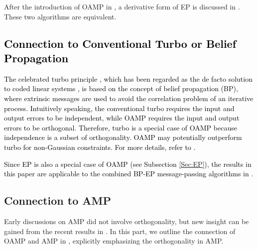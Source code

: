 \documentclass[journal]{IEEEtran}
\newcommand{\LL}[1]{\textcolor{black}{#1}}
\begin{document}
After the introduction of OAMP in \cite{Ma2016}, a derivative form of EP is discussed in  \cite{Fletcher2016}. These two algorithms are equivalent. 
 
\subsection{\LL{Connection to Conventional Turbo or Belief Propagation}}\label{Sec:BP}
\LL{The celebrated turbo principle \cite{TurboCode, Wang1999, Tuchler2002, Douillard1995}, which has been regarded as the de facto solution to coded linear systems \cite{Loeliger2007,  Yuan2014, LiuLei2019TSP}, is based on the concept of belief propagation (BP), where extrinsic messages are used to avoid the correlation problem of an iterative process. Intuitively speaking, the conventional turbo requires the input and output errors to be independent, while OAMP requires the input and output errors to be orthogonal. Therefore, turbo is a special case of OAMP because independence is a subset of orthogonality. OAMP may potentially outperform turbo for non-Gaussian constraints. For more details, refer to \cite[Section III-D]{MaLiu2018}.}

\LL{Since EP is also a special case of OAMP (see Subsection \ref{Sec:EP}), the results in this paper are  applicable to the combined BP-EP message-passing algorithms in \cite{Sun2015}.}

 

\subsection{Connection to AMP}\label{Sec:relat2AMP}
Early discussions on AMP did not involve orthogonality, but new insight can be gained from the recent results in \cite{Takeuchi2019}. In this part, we outline the connection of OAMP and AMP in \cite{Takeuchi2019},  explicitly emphasizing the orthogonality in AMP. 
\end{document}
